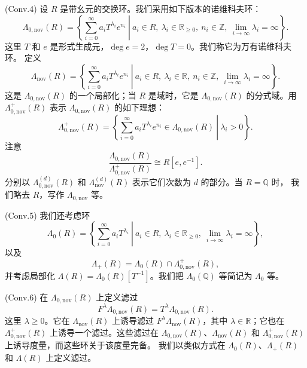 \par\smallskip\noindent\textup{(Conv.4)}\quad
设 $R$ 是带幺元的交换环。我们采用如下版本的诺维科夫环：
\[
  \Lambda_{0,\mathrm{nov}}(R)
  =\left\{
    \left.
    \sum_{i=0}^{\infty}a_iT^{\lambda_i}e^{n_i}
    \ \right|\ 
    a_i\in R,
    \ \lambda_i\in\mathbb R_{\geq0},
    \ n_i\in\mathbb Z,
    \ \lim_{i\to\infty}\lambda_i=\infty
  \right\}.
\]
这里 $T$ 和 $e$ 是形式生成元，$\deg e=2$，$\deg T=0$。我们称它为万有诺维科夫环。
定义
\[
  \Lambda_{\mathrm{nov}}(R)
  =\left\{
    \left.
    \sum_{i=0}^{\infty}a_iT^{\lambda_i}e^{n_i}
    \ \right|\ 
    a_i\in R,
    \ \lambda_i\in\mathbb R,
    \ n_i\in\mathbb Z,
    \ \lim_{i\to\infty}\lambda_i=\infty
  \right\}.
\]
这是 $\Lambda_{0,\mathrm{nov}}(R)$ 的一个局部化；当 $R$ 是域时，它是
$\Lambda_{0,\mathrm{nov}}(R)$ 的分式域。用 $\Lambda^+_{0,\mathrm{nov}}(R)$
表示 $\Lambda_{0,\mathrm{nov}}(R)$ 的如下理想：
\[
  \Lambda^+_{0,\mathrm{nov}}(R)
  =\left\{
    \left.
    \sum_{i=0}^{\infty}a_iT^{\lambda_i}e^{n_i}
    \in\Lambda_{0,\mathrm{nov}}(R)
    \ \right|\ 
    \lambda_i>0
  \right\}.
\]
注意
\begin{equation}
  \frac{\Lambda_{0,\mathrm{nov}}(R)}
       {\Lambda^+_{0,\mathrm{nov}}(R)}
  \cong R[e,e^{-1}].
  \tag{1.37}\label{eq:1-37}
\end{equation}
分别以 $\Lambda^{(d)}_{0,\mathrm{nov}}(R)$ 和
$\Lambda^{(d)}_{\mathrm{nov}}(R)$ 表示它们次数为 $d$ 的部分。当 $R=\mathbb Q$ 时，
我们略去 $R$，写作 $\Lambda_{0,\mathrm{nov}}$ 等。

\par\smallskip\noindent\textup{(Conv.5)}\quad
我们还考虑环
\[
  \Lambda_0(R)
  =\left\{
    \left.
    \sum_{i=0}^{\infty}a_iT^{\lambda_i}
    \ \right|\ 
    a_i\in R,
    \ \lambda_i\in\mathbb R_{\geq0},
    \ \lim_{i\to\infty}\lambda_i=\infty
  \right\},
\]
以及
\[
  \Lambda_+(R)=\Lambda_0(R)\cap\Lambda^+_{0,\mathrm{nov}}(R),
\]
并考虑局部化 $\Lambda(R)=\Lambda_0(R)[T^{-1}]$。我们把
$\Lambda_0(\mathbb Q)$ 等简记为 $\Lambda_0$ 等。

\par\smallskip\noindent\textup{(Conv.6)}\quad
在 $\Lambda_{0,\mathrm{nov}}(R)$ 上定义滤过
\begin{equation}
  F^\lambda\Lambda_{0,\mathrm{nov}}(R)
  =T^\lambda\Lambda_{0,\mathrm{nov}}(R).
  \tag{1.38}\label{eq:1-38}
\end{equation}
这里 $\lambda\geq0$。它在 $\Lambda_{\mathrm{nov}}(R)$ 上诱导滤过
$F^\lambda\Lambda_{\mathrm{nov}}(R)$，其中 $\lambda\in\mathbb R$；它也在
$\Lambda^+_{0,\mathrm{nov}}(R)$ 上诱导一个滤过。这些滤过在
$\Lambda_{0,\mathrm{nov}}(R)$、$\Lambda_{\mathrm{nov}}(R)$ 和
$\Lambda^+_{0,\mathrm{nov}}(R)$ 上诱导度量，而这些环关于该度量完备。
我们以类似方式在 $\Lambda_0(R)$、$\Lambda_+(R)$ 和 $\Lambda(R)$ 上定义滤过。
